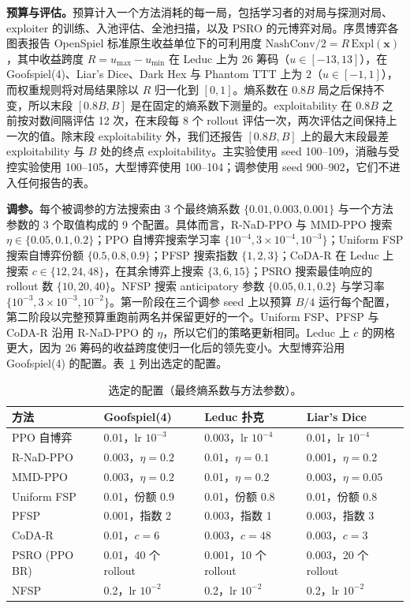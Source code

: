 \documentclass{article}
\theoremstyle{plain}
\theoremstyle{remark}
\newcommand{\Expl}{\mathrm{Expl}}
\newcommand{\bx}{{\bm{x}}}
\newcommand{\codar}{CoDA-R}
\newcommand{\rnad}{R-NaD-PPO}
\begin{document}
\textbf{预算与评估。}预算计入一个方法消耗的每一局，包括学习者的对局与探测对局、exploiter 的训练、入池评估、全池扫描，以及 PSRO 的元博弈对局。序贯博弈各图表报告 OpenSpiel 标准原生收益单位下的可利用度 $\mathrm{NashConv}/2=R\,\Expl(\bx)$，其中收益跨度 $R=u_{\max}-u_{\min}$ 在 Leduc 上为 $26$ 筹码（$u\in[-13,13]$），在 Goofspiel(4)、Liar's Dice、Dark Hex 与 Phantom TTT 上为 $2$（$u\in[-1,1]$），而权重规则将对局结果除以 $R$ 归一化到 $[0,1]$。熵系数在 $0.8B$ 局之后保持不变，所以末段 $[0.8B,B]$ 是在固定的熵系数下测量的。exploitability 在 $0.8B$ 之前按对数间隔评估 12 次，在末段每 8 个 rollout 评估一次，两次评估之间保持上一次的值。除末段 exploitability 外，我们还报告 $[0.8B,B]$ 上的最大末段最差 exploitability 与 $B$ 处的终点 exploitability。主实验使用 seed 100--109，消融与受控实验使用 100--105，大型博弈使用 100--104；调参使用 seed 900--902，它们不进入任何报告的表。

\textbf{调参。}每个被调参的方法搜索由 3 个最终熵系数 $\{0.01,0.003,0.001\}$ 与一个方法参数的 3 个取值构成的 9 个配置。具体而言，\rnad{} 与 MMD-PPO 搜索 $\eta\in\{0.05,0.1,0.2\}$；PPO 自博弈搜索学习率 $\{10^{-4},3\times10^{-4},10^{-3}\}$；Uniform FSP 搜索自博弈份额 $\{0.5,0.8,0.9\}$；PFSP 搜索指数 $\{1,2,3\}$；\codar{} 在 Leduc 上搜索 $c\in\{12,24,48\}$，在其余博弈上搜索 $\{3,6,15\}$；PSRO 搜索最佳响应的 rollout 数 $\{10,20,40\}$。NFSP 搜索 anticipatory 参数 $\{0.05,0.1,0.2\}$ 与学习率 $\{10^{-3},3\times10^{-3},10^{-2}\}$。第一阶段在三个调参 seed 上以预算 $B/4$ 运行每个配置，第二阶段以完整预算重跑前两名并保留更好的一个。Uniform FSP、PFSP 与 \codar{} 沿用 \rnad{} 的 $\eta$，所以它们的策略更新相同。Leduc 上 $c$ 的网格更大，因为 26 筹码的收益跨度使归一化后的领先变小。大型博弈沿用 Goofspiel(4) 的配置。表~\ref{tab:tuning} 列出选定的配置。

\begin{table}[!htbp]
\caption{选定的配置（最终熵系数与方法参数）。}
\label{tab:tuning}
\begin{center}
\footnotesize
\begin{tabular}{llll}
\toprule
方法 & Goofspiel(4) & Leduc 扑克 & Liar's Dice \\
\midrule
PPO 自博弈 & 0.01，lr $10^{-3}$ & 0.003，lr $10^{-4}$ & 0.01，lr $10^{-4}$ \\
\rnad{} & 0.003，$\eta=0.2$ & 0.01，$\eta=0.1$ & 0.001，$\eta=0.2$ \\
MMD-PPO & 0.003，$\eta=0.2$ & 0.01，$\eta=0.2$ & 0.003，$\eta=0.05$ \\
Uniform FSP & 0.01，份额 0.9 & 0.01，份额 0.8 & 0.01，份额 0.8 \\
PFSP & 0.001，指数 2 & 0.003，指数 1 & 0.003，指数 3 \\
\codar{} & 0.01，$c=6$ & 0.003，$c=48$ & 0.003，$c=3$ \\
PSRO (PPO BR) & 0.01，40 个 rollout & 0.001，10 个 rollout & 0.003，20 个 rollout \\
NFSP & 0.2，lr $10^{-2}$ & 0.2，lr $10^{-2}$ & 0.2，lr $10^{-2}$ \\
\bottomrule
\end{tabular}
\end{center}
\end{table}
\end{document}
